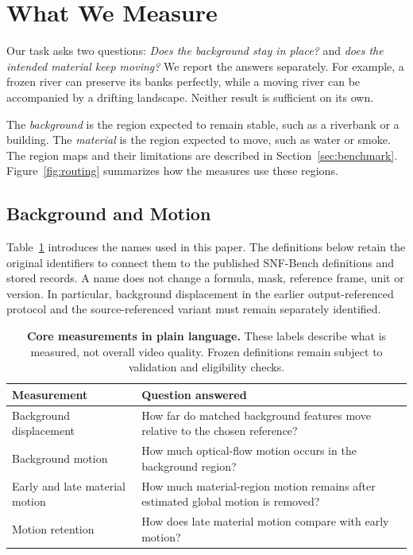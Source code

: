 \section{What We Measure}
\label{sec:measurement}
Our task asks two questions: \emph{Does the background stay in place?} and \emph{does the intended material keep moving?} We report the answers separately. For example, a frozen river can preserve its banks perfectly, while a moving river can be accompanied by a drifting landscape. Neither result is sufficient on its own.

The \emph{background} is the region expected to remain stable, such as a riverbank or a building. The \emph{material} is the region expected to move, such as water or smoke. The region maps and their limitations are described in Section~\ref{sec:benchmark}. Figure~\ref{fig:routing} summarizes how the measures use these regions.


\subsection{Background and Motion}
Table~\ref{tab:plain_metrics} introduces the names used in this paper. The definitions below retain the original identifiers to connect them to the published SNF-Bench definitions and stored records. A name does not change a formula, mask, reference frame, unit or version. In particular, background displacement in the earlier output-referenced protocol and the source-referenced variant must remain separately identified.

\begin{table}[t]
\caption{\textbf{Core measurements in plain language.} These labels describe what is measured, not overall video quality. Frozen definitions remain subject to validation and eligibility checks.}
\label{tab:plain_metrics}
\centering
\setlength{\tabcolsep}{3pt}
\begin{tabular}{@{}p{}p{}@{}}
\toprule
Measurement & Question answered \\
\midrule
Background displacement & How far do matched background features move relative to the chosen reference? \\
Background motion & How much optical-flow motion occurs in the background region? \\
Early and late material motion & How much material-region motion remains after estimated global motion is removed? \\
Motion retention & How does late material motion compare with early motion? \\
\bottomrule
\end{tabular}
\end{table}

